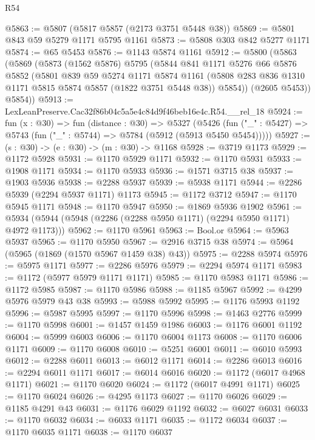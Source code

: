 \begin{lexlean}{R54}
\begin{coremodule}
@5863 := @5807 (@5817 @5857 (@2173 @3751 @5448 @38))
@5869 := @5801 @843 @59 @5279 @1171 @5795 @1161
@5873 := @5808 @303 @842 @5277 @1171
@5874 := @65 @5453
@5876 := @1143 @5874 @1161
@5912 := @5800
    (@5863
      (@5869
        (@5873
          (@1562 @5876)
          @5795
          (@5844
            @841
            @1171
            @5276
            @66
            @5876
            @5852
            (@5801
              @839
              @59
              @5274
              @1171
              @5874
              @1161
              (@5808 @283 @836 @1310 @1171 @5815 @5874 @5857 (@1822 @3751 @5448 @38))
              @5854))
          (@2605 @5453))
        @5854))
@5913 := LexLeanPreserve.Cac32f86b04c5a5e4c84d9f46beb16e4c.R54.__rel_18
@5924 := fun (x : @30) =>
  fun (distance : @30) =>
  @5327
    (@5426 (fun ("_" : @5427) => @5743 (fun ("_" : @5744) => @5784 (@5912 (@5913 @5450 @5454)))))
@5927 := (s : @30) -> (e : @30) -> (m : @30) -> @1168
@5928 := @3719 @1173
@5929 := @1172 @5928
@5931 := @1170 @5929 @1171
@5932 := @1170 @5931
@5933 := @1908 @1171
@5934 := @1170 @5933
@5936 := @1571 @3715 @38
@5937 := @1903 @5936
@5938 := @2288 @5937
@5939 := @5938 @1171
@5944 := @2286 @5939 (@2294 @5937 @1171) @1173
@5945 := @1172 @3712
@5947 := @1170 @5945 @1171
@5948 := @1170 @5947
@5950 := @1869 @5936 @1902
@5961 := @5934 (@5944 (@5948 (@2286 (@2288 @5950 @1171) (@2294 @5950 @1171) @4972 @1173)))
@5962 := @1170 @5961
@5963 := Bool.or
@5964 := @5963 @5937
@5965 := @1170 @5950
@5967 := @2916 @3715 @38
@5974 := @5964 (@5965 (@1869 (@1570 @5967 @1459 @38) @43))
@5975 := @2288 @5974
@5976 := @5975 @1171
@5977 := @2286 @5976
@5979 := @2294 @5974 @1171
@5983 := @1172 (@5977 @5979 @1171 @1171)
@5985 := @1170 @5983 @1171
@5986 := @1172 @5985
@5987 := @1170 @5986
@5988 := @1185 @5967
@5992 := @4299 @5976 @5979 @43 @38
@5993 := @5988 @5992
@5995 := @1176 @5993 @1192
@5996 := @5987 @5995
@5997 := @1170 @5996
@5998 := @1463 @2776
@5999 := @1170 @5998
@6001 := @1457 @1459 @1986
@6003 := @1176 @6001 @1192
@6004 := @5999 @6003
@6006 := @1170 @6004 @1173
@6008 := @1170 @6006 @1171
@6009 := @1170 @6008
@6010 := @5251 @6001
@6011 := @6010 @5993
@6012 := @2288 @6011
@6013 := @6012 @1171
@6014 := @2286 @6013
@6016 := @2294 @6011 @1171
@6017 := @6014 @6016
@6020 := @1172 (@6017 @4968 @1171)
@6021 := @1170 @6020
@6024 := @1172 (@6017 @4991 @1171)
@6025 := @1170 @6024
@6026 := @4295 @1173
@6027 := @1170 @6026
@6029 := @1185 @4291 @43
@6031 := @1176 @6029 @1192
@6032 := @6027 @6031
@6033 := @1170 @6032
@6034 := @6033 @1171
@6035 := @1172 @6034
@6037 := @1170 @6035 @1171
@6038 := @1170 @6037

\end{coremodule}
\end{lexlean}
